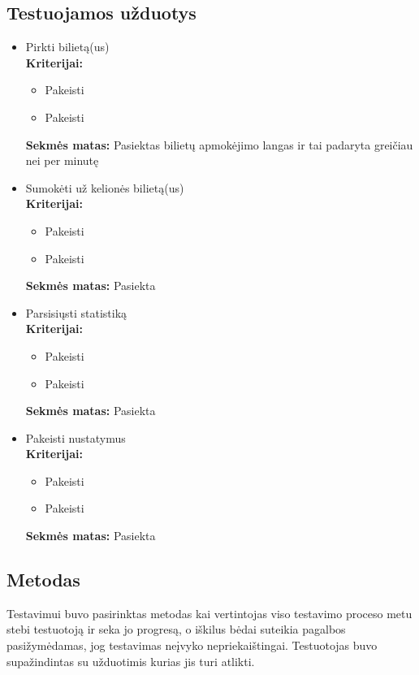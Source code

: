 \documentclass{VUMIFPSkursinis}
\begin{document}
\subsection{Testuojamos užduotys}
\begin{itemize}
\item Pirkti bilietą(us) \\
	\textbf{Kriterijai:}
	\begin{itemize}
	\item Pakeisti
	\item Pakeisti
	\end{itemize}
	\textbf{Sekmės matas:} Pasiektas bilietų apmokėjimo langas ir tai padaryta greičiau nei per minutę \\

\item Sumokėti už kelionės bilietą(us)  \\
	\textbf{Kriterijai:}
	\begin{itemize}
	\item Pakeisti
	\item Pakeisti
	\end{itemize}
	\textbf{Sekmės matas:} Pasiekta \\

\item Parsisiųsti statistiką  \\
	\textbf{Kriterijai:}
	\begin{itemize}
	\item Pakeisti
	\item Pakeisti
	\end{itemize}
	\textbf{Sekmės matas:} Pasiekta \\

\item Pakeisti nustatymus  \\
	\textbf{Kriterijai:}
	\begin{itemize}
	\item Pakeisti
	\item Pakeisti
	\end{itemize}
	\textbf{Sekmės matas:} Pasiekta \\
\end{itemize}

\subsection{Metodas}
Testavimui buvo pasirinktas metodas kai vertintojas viso testavimo proceso metu stebi testuotoją ir seka jo progresą, o iškilus bėdai suteikia pagalbos pasižymėdamas, jog testavimas neįvyko nepriekaištingai. Testuotojas buvo supažindintas su užduotimis kurias jis turi atlikti.
\end{document}
